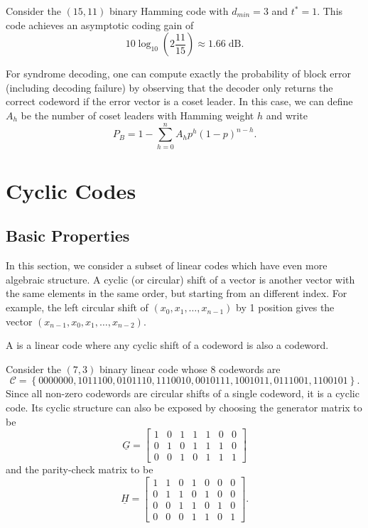\begin{example}
Consider the $(15,11)$ binary Hamming code with $d_{min} = 3$ and $t^* = 1$.
This code achieves an asymptotic coding gain of
\[ 10 \log_{10} \left( 2 \frac{11}{15} \right) \approx 1.66 \; \mathrm{dB}. \]
\end{example}

For syndrome decoding, one can compute exactly the probability of block error (including decoding failure) by observing that the decoder only returns the correct codeword if the error vector is a coset leader.
In this case, we can define $A_h$ be the number of coset leaders with Hamming weight $h$ and write
\[ P_{B} = 1-\sum_{h=0}^{n} A_h p^h (1-p)^{n-h}. \]

\section{Cyclic Codes}

\subsection{Basic Properties}
In this section, we consider a subset of linear codes which have even more algebraic structure.
A cyclic (or circular) shift of a vector is another vector with the same elements in the same order, but starting from an different index.
For example, the left circular shift of $(x_0,x_1,\ldots,x_{n-1})$ by 1 position gives the vector $(x_{n-1},x_0,x_1,\ldots,x_{n-2})$.

\begin{definition}
A  is a linear code where any cyclic shift of a codeword is also a codeword.
\end{definition}

\begin{example}
Consider the $(7,3)$ binary linear code whose 8 codewords are
\[ \mathcal{C} = \left\{
0000000,
1011100,
0101110,
1110010,
0010111,
1001011,
0111001,
1100101
\right\}. \]
Since all non-zero codewords are circular shifts of a single codeword, it is a cyclic code.
Its cyclic structure can also be exposed by choosing the generator matrix to be
\[ \underline{G} = \left[ \begin{array}{ccccccc}
1 & 0 & 1 & 1 & 1 & 0 & 0 \\
0 & 1 & 0 & 1 & 1 & 1 & 0 \\
0 & 0 & 1 & 0 & 1 & 1 & 1 \end{array} \right] \]
and the parity-check matrix to be
\[ \underline{H} = \left[ \begin{array}{ccccccc}
1 & 1 & 0 & 1 & 0 & 0 & 0 \\
0 & 1 & 1 & 0 & 1 & 0 & 0 \\
0 & 0 & 1 & 1 & 0 & 1 & 0 \\
0 & 0 & 0 & 1 & 1 & 0 & 1 \end{array} \right]. \]
\end{example}

